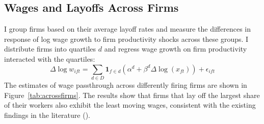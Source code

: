 \subsection*{Wages and Layoffs Across Firms}
I group firms based on their average layoff rates and measure the differences in response of log wage growth to firm productivity shocks across these groups. I distribute firms into quartiles $d$ and regress wage growth on firm productivity interacted with the quartiles:
\[ \Delta \log w_{ift} = \sum_{d \in D} \mathbf{1}_{f \in d}(\alpha^d + \beta^{d}\Delta \log(x_{ft})) + \epsilon_{ift}\]
The estimates of wage passthrough across differently firing firms are shown in Figure~\ref{tab:acrossfirms}. The results show that firms that lay off the largest share of their workers also exhibit the least moving wages, consistent with the existing findings in the literature (\textcite{enrlich2024}). 


